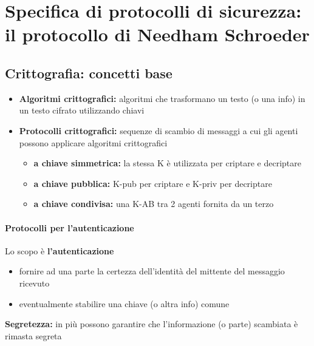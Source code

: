 \chapter{Specifica di protocolli di sicurezza: il protocollo di Needham Schroeder}
\section{Crittografia: concetti base}
\begin{itemize}
    \item \textbf{Algoritmi crittografici:} algoritmi che trasformano un testo (o una info) in un testo cifrato utilizzando chiavi
    \item \textbf{Protocolli crittografici:} sequenze di scambio di messaggi a cui gli agenti possono applicare
    algoritmi crittografici
    \begin{itemize}
        \item \textbf{a chiave simmetrica:} la stessa K è utilizzata per criptare e decriptare
        \item \textbf{a chiave pubblica:} K-pub per criptare e K-priv per decriptare
        \item \textbf{a chiave condivisa:} una K-AB tra 2 agenti fornita da un terzo
    \end{itemize}
\end{itemize}

\subsubsection{Protocolli per l'autenticazione}
\noindent Lo scopo è \textbf{l'autenticazione}
\begin{itemize}
    \item fornire ad una parte la certezza dell'identità del mittente del messaggio ricevuto 
    \item eventualmente stabilire una chiave (o altra info) comune 
\end{itemize}

\noindent \textbf{Segretezza:} in più possono garantire che l'informazione (o parte) scambiata è rimasta segreta

